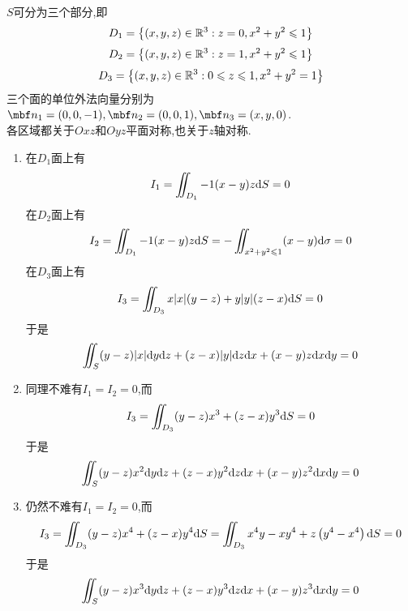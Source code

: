 \documentclass{ctexart}
\begin{document}
\begin{solution}
    $S$可分为三个部分,即
    \[D_1=\left\{(x,y,z)\in\mathbb{R}^3:z=0,x^2+y^2\leqslant1\right\}\]
    \[D_2=\left\{(x,y,z)\in\mathbb{R}^3:z=1,x^2+y^2\leqslant1\right\}\]
    \[D_3=\left\{(x,y,z)\in\mathbb{R}^3:0\leqslant z\leqslant 1,x^2+y^2=1\right\}\]
    三个面的单位外法向量分别为$\mbf n_1=(0,0,-1),\mbf n_2=(0,0,1),\mbf n_3=(x,y,0)$.\\
    各区域都关于$Oxz$和$Oyz$平面对称,也关于$z$轴对称.
    \begin{enumerate}[label=\tbf{(\arabic*)}]
        \item 在$D_1$面上有
            \[I_1=\iint_{D_1}-1(x-y)z\mathrm{d} S=0\]
            在$D_2$面上有
            \[I_2=\iint_{D_1}-1(x-y)z\mathrm{d} S=-\iint_{x^2+y^2\leqslant 1}(x-y)\mathrm{d}\sigma=0\]
            在$D_3$面上有
            \[I_3=\iint_{D_3}x|x|(y-z)+y|y|(z-x)\mathrm{d} S=0\]
            于是
            \[\iint_S(y-z)|x|\mathrm{d} y\mathrm{d} z+(z-x)|y|\mathrm{d} z\mathrm{d} x+(x-y)z\mathrm{d} x\mathrm{d} y=0\]
        \item 同理不难有$I_1=I_2=0$,而
            \[I_3=\iint_{D_3}(y-z)x^3+(z-x)y^3\mathrm{d} S=0\]
            于是
            \[\iint_S(y-z)x^2\mathrm{d} y\mathrm{d} z+(z-x)y^2\mathrm{d} z\mathrm{d} x+(x-y)z^2\mathrm{d} x\mathrm{d} y=0\]
        \item 仍然不难有$I_1=I_2=0$,而
            \[I_3=\iint_{D_3}(y-z)x^4+(z-x)y^4\mathrm{d} S=\iint_{D_3}x^4y-xy^4+z\left(y^4-x^4\right)\mathrm{d} S=0\]
            于是
            \[\iint_S(y-z)x^3\mathrm{d} y\mathrm{d} z+(z-x)y^3\mathrm{d} z\mathrm{d} x+(x-y)z^3\mathrm{d} x\mathrm{d} y=0\]
    \end{enumerate}
\end{solution}
\end{document}
